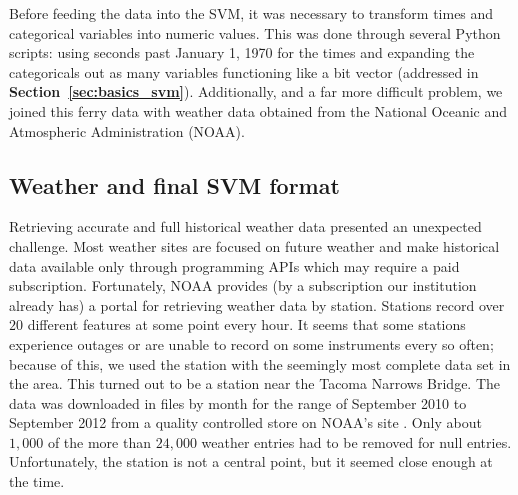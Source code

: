 \documentclass[11pt]{article} %
\begin{document}
Before feeding the data into the SVM, it was necessary to transform times and 
categorical variables into numeric values. This was done through several Python
scripts: using seconds past January 1, 1970 for the times and expanding the 
categoricals out as many variables functioning like a bit vector (addressed in 
\textbf{Section~\ref{sec:basics_svm}}). Additionally,
and a far more difficult problem, we joined this ferry data with weather data
obtained from the National Oceanic and Atmospheric Administration (NOAA).

% 
% 

\subsection{Weather and final SVM format}
\label{sec:data_origins}
Retrieving accurate and full historical weather data presented an unexpected 
challenge. Most weather sites are focused on future weather and make historical
data available only through programming APIs which may require a paid subscription.
Fortunately, NOAA provides (by a subscription our institution already has) a portal 
for retrieving weather data
by station. Stations record over $20$ different features at some point every hour.
It seems that some stations experience outages or are unable to record on some
instruments every so often; because of this, we used the station with the seemingly
most complete data set in the area. This turned out to be a station near the 
Tacoma Narrows Bridge. The data was downloaded in files by month for the range of
September 2010 to September 2012 from a quality controlled store on NOAA's 
site \cite{noaaWeather}. Only about $1,000$ of the more than $24,000$ weather 
entries had to be removed for null entries.  Unfortunately, 
the station is not a central point, but it seemed close enough at the time. 
\end{document}
